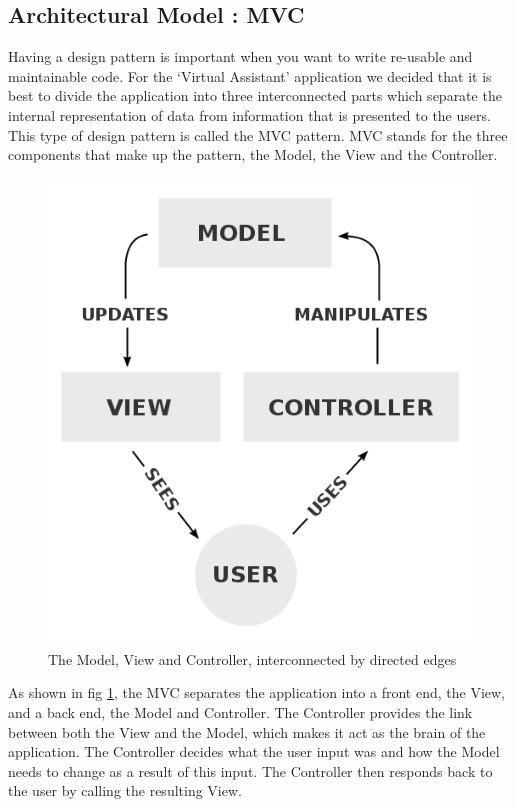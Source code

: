 \subsection{Architectural Model : MVC}
Having a design pattern is important when you want to write re-usable and maintainable code.
For the `Virtual Assistant' application we decided that it is best to divide the application into three interconnected parts which separate the internal representation of data from information that is presented to the users\cite{wiki:mvc}. This type of design pattern is called the MVC pattern. MVC stands for the three components that make up the pattern, the Model, the View and the Controller.
\begin{figure}[h]
\centering
\includegraphics[scale=0.3]{./img/MVC.png}
\caption{\small{The Model, View and Controller, interconnected by directed edges}}
\label{mvc}
	
\end{figure}

\newpage

As shown in fig \ref{mvc}, the MVC separates the application into a front end, the View, and a back end, the Model and Controller. The Controller provides the link between both the View and the Model, which makes it act as the brain of the application. The Controller decides what the user input was and how the Model needs to change as a result of this input\cite{codinghorror}. The Controller then responds back to the user by calling the resulting View.

